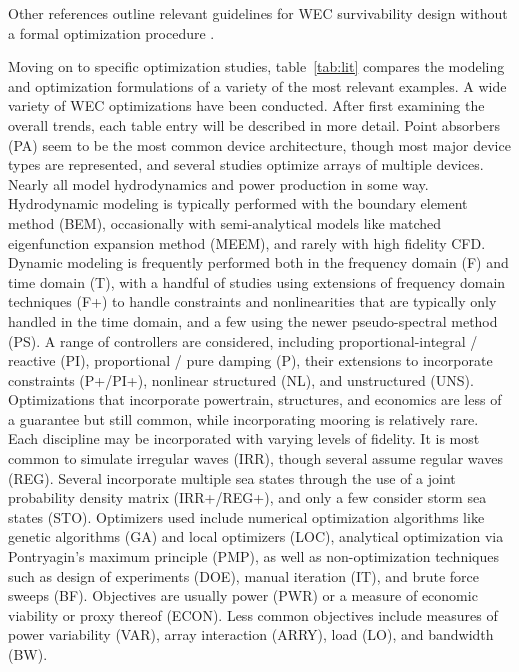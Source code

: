 
Other references outline relevant guidelines for WEC survivability design without a formal optimization procedure \cite{coe_survey_2018, ove_arup__partners_ltd_structural_2016,paduano_towards_2024,giannini_wave_2022}.

Moving on to specific optimization studies, table~\ref{tab:lit} compares the modeling and optimization formulations of a variety of the most relevant examples.
A wide variety of WEC optimizations have been conducted.
After first examining the overall trends, each table entry will be described in more detail.
Point absorbers (PA) seem to be the most common device architecture, though most major device types are represented, and several studies optimize arrays of multiple devices.
Nearly all model hydrodynamics and power production in some way.
Hydrodynamic modeling is typically performed with the boundary element method (BEM), occasionally with semi-analytical models like matched eigenfunction expansion method (MEEM), and rarely with high fidelity CFD.
Dynamic modeling is frequently performed both in the frequency domain (F) and time domain (T), with a handful of studies using extensions of frequency domain techniques (F+) to handle constraints and nonlinearities that are typically only handled in the time domain, and a few using the newer pseudo-spectral method (PS).
A range of controllers are considered, including proportional-integral / reactive (PI), proportional / pure damping (P), their extensions to incorporate constraints (P+/PI+), nonlinear structured (NL), and unstructured (UNS).
Optimizations that incorporate powertrain, structures, and economics are less of a guarantee but still common, while incorporating mooring is relatively rare.
Each discipline may be incorporated with varying levels of fidelity.
It is most common to simulate irregular waves (IRR), though several assume regular waves (REG).
Several incorporate multiple sea states through the use of a joint probability density matrix (IRR+/REG+), and only a few consider storm sea states (STO).
Optimizers used include numerical optimization algorithms like genetic algorithms (GA) and local optimizers (LOC), analytical optimization via Pontryagin's maximum principle (PMP), as well as non-optimization techniques such as design of experiments (DOE), manual iteration (IT), and brute force sweeps (BF).
Objectives are usually power (PWR) or a measure of economic viability or proxy thereof (ECON).
Less common objectives include measures of power variability (VAR), array interaction (ARRY), load (LO), and bandwidth (BW).
